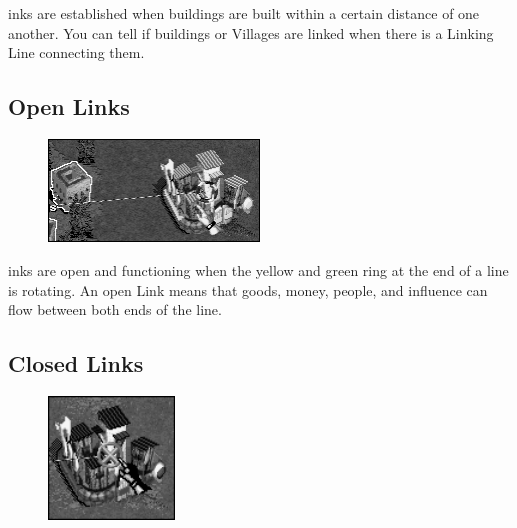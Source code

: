 
inks are established when buildings are built within a certain distance of one another. You can tell if buildings or Villages are linked when there is a Linking Line connecting them.

\subsection{\textsf{Open Links}}


\begin{figure}
    \vspace{-20pt}
    \begin{center}
        \includegraphics[width=0.5\textwidth]{Iopenlink_fort} %
    \end{center}
    \vspace{-20pt}
\end{figure}

inks are open and functioning when the yellow and green ring at the end of a line is rotating. An open Link means that goods, money, people, and influence can flow between both ends of the line.

\subsection{\textsf{Closed Links}}


\begin{figure}
    \vspace{-20pt}
    \begin{center}
        \includegraphics[width=0.3\textwidth]{Icloselink_fort} %
    \end{center}
    \vspace{-10pt}
\end{figure}


